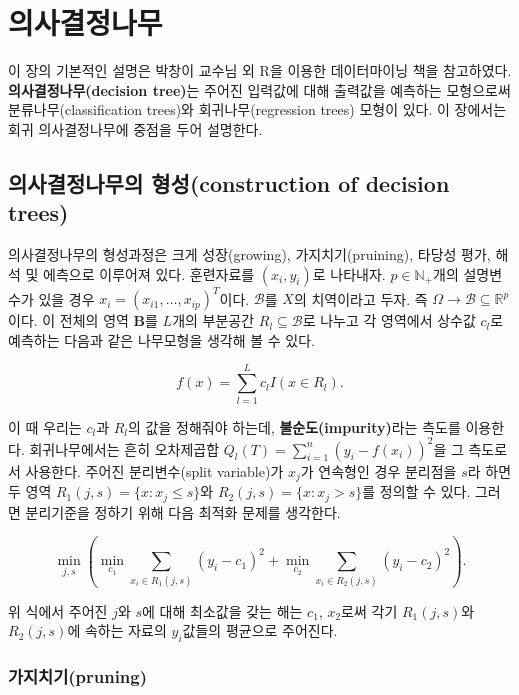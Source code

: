 \documentclass[b5paper,]{scrbook}
\theoremstyle{plain}
\theoremstyle{definition}
\numberwithin{equation}{section}
\begin{document}
\hypertarget{trees}{%
\chapter{의사결정나무}\label{trees}}

이 장의 기본적인 설명은 박창이 교수님 외 R을 이용한 데이터마이닝 책을 참고하였다. \textbf{의사결정나무(decision tree)}는 주어진 입력값에 대해 출력값을 예측하는 모형으로써 분류나무(classification trees)와 회귀나무(regression trees) 모형이 있다. 이 장에서는 회귀 의사결정나무에 중점을 두어 설명한다.

\hypertarget{-construction-of-decision-trees}{%
\section{의사결정나무의 형성(construction of decision trees)}\label{-construction-of-decision-trees}}

의사결정나무의 형성과정은 크게 성장(growing), 가지치기(pruining), 타당성 평가, 해석 및 에측으로 이루어져 있다. 훈련자료를 \((x_{i}, y_{i})\)로 나타내자. \(p \in \mathbb{N}_{+}\)개의 설명변수가 있을 경우 \(x_{i}=(x_{i1}, \ldots, x_{ip})^{T}\)이다. \(\mathcal{B}\)를 \(X\)의 치역이라고 두자. 즉 \(\Omega \rightarrow \mathcal{B} \subseteq \mathbb{R}^{p}\)이다. 이 전체의 영역 \(\mathbf{B}\)를 \(L\)개의 부분공간 \(R_{l}\subseteq \mathcal{B}\)로 나누고 각 영역에서 상수값 \(c_{l}\)로 예측하는 다음과 같은 나무모형을 생각해 볼 수 있다.

\[f(x)=\sum_{l=1}^{L}c_{l}I(x\in R_{l}).\]

이 때 우리는 \(c_{l}\)과 \(R_{l}\)의 값을 정해줘야 하는데, \textbf{불순도(impurity)}라는 측도를 이용한다. 회귀나무에서는 흔히 오차제곱합 \(Q_{l}(T)=\sum_{i=1}^{n}(y_{i}-f(x_{i}))^{2}\)을 그 측도로서 사용한다. 주어진 분리변수(split variable)가 \(x_{j}\)가 연속형인 경우 분리점을 \(s\)라 하면 두 영역 \(R_{1}(j,s)=\{ x: x_{j} \leq s\}\)와 \(R_{2}(j,s)=\{ x: x_{j} > s\}\)를 정의할 수 있다. 그러면 분리기준을 정하기 위해 다음 최적화 문제를 생각한다.

\[\min_{j,s}(\min_{c_{1}}\sum_{x_{i}\in R_{1}(j,s)}(y_{i}-c_{1})^{2} + \min_{c_{2}}\sum_{x_{i}\in R_{2}(j,s)}(y_{i}-c_{2})^{2}).\]

위 식에서 주어진 \(j\)와 \(s\)에 대해 최소값을 갖는 해는 \(c_{1}\), \(x_{2}\)로써 각기 \(R_{1}(j,s)\)와 \(R_{2}(j,s)\)에 속하는 자료의 \(y_{i}\)값들의 평균으로 주어진다.

\hypertarget{pruning}{%
\subsection{가지치기(pruning)}\label{pruning}}
\end{document}
